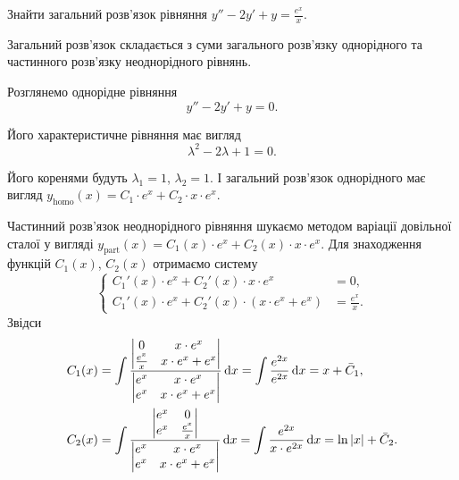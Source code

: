 \begin{example}
	Знайти загальний розв'язок рівняння $y'' - 2 y' + y = \frac{e^x}{x}$.
\end{example}

\begin{solution}
	Загальний розв'язок складається з суми загального роз\-в'яз\-ку однорідного та частинного роз\-в'яз\-ку неоднорідного рівнянь. \parvskip

	Розглянемо однорідне рівняння
	\begin{equation*}
		y'' - 2 y' + y = 0.
	\end{equation*}
	
	Його характеристичне рівняння має вигляд
	\begin{equation*}
		\lambda^2 - 2 \lambda + 1 = 0.
	\end{equation*}

	Його коренями будуть $\lambda_1 = 1$, $\lambda_2 = 1$. І загальний роз\-в'яз\-ок однорідного має вигляд $y_{\text{homo}}(x) = C_1 \cdot e^x + C_2 \cdot x \cdot e^x$.  \parvskip

	Частинний розв'язок неоднорідного рівняння шукаємо методом варіації довільної сталої у вигляді $y_{\text{part}}(x) = C_1(x) \cdot e^x + C_2(x) \cdot x \cdot e^x$. Для знаходження функцій $C_1(x)$, $C_2(x)$ отримаємо систему 
	\begin{equation*}
		\left\{
			\begin{aligned}
				C_1'(x) \cdot e^x + C_2'(x) \cdot x \cdot e^x &= 0, \\
				C_1'(x) \cdot e^x + C_2'(x) \cdot \left( x \cdot e^x + e^x \right) &= \frac{e^x}{x}.
			\end{aligned}
		\right.
	\end{equation*}
	Звідси
	\begin{align*}
		C_1(x) &= \int \frac{\begin{vmatrix} 0 & x \cdot e^x \\ \frac{e^x}{x} & x \cdot e^x + e^x \end{vmatrix}}{\begin{vmatrix} e^x & x \cdot e^x \\ e^x & x \cdot e^x + e^x \end{vmatrix}} \mathop{}\!\mathrm{d} x = \int \frac{e^{2x}}{e^{2x}} \mathop{}\!\mathrm{d} x = x + \bar C_1, \\
		C_2(x) &= \int \frac{\begin{vmatrix} e^x & 0 \\ e^x & \frac{e^x}{x} \end{vmatrix}}{\begin{vmatrix} e^x & x \cdot e^x \\ e^x & x \cdot e^x + e^x \end{vmatrix}} \mathop{}\!\mathrm{d} x = \int \frac{e^{2x}}{x \cdot e^{2x}} \mathop{}\!\mathrm{d} x = \ln |x| + \bar C_2.
	\end{align*}


\end{solution}
